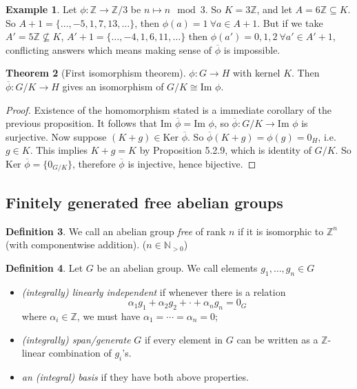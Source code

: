 \documentclass[a4paper]{article}
\newcommand{\Ker}{\text{Ker }}
\theoremstyle{definition}
\newtheorem{defn}{Definition}[subsection]
\newtheorem{thm}[defn]{Theorem}
\newtheorem{example}[defn]{Example}
\begin{document}
\begin{example}
Let $\phi: \mathbb Z \rightarrow \mathbb Z/3$ be $n\mapsto n\mod 3$. So $K=3\mathbb Z$, and let $A=6\mathbb Z \subseteq K.$ So $A+1=\{\ldots,-5,1,7,13,\ldots\}$, then $\phi(a) = 1 \ \forall a\in A+1.$ But if we take $A'=5\mathbb Z \not\subseteq K$, $A'+1=\{\ldots,-4,1,6,11,\ldots\}$ then $\phi(a')=0,1,2 \ \forall a'\in A'+1$, conflicting answers which means making sense of $\overline{\phi}$ is impossible.
\end{example}
\begin{thm}[First isomorphism theorem]
$\phi : G\rightarrow H$ with kernel $K.$ Then $\overline{\phi}: G/K \rightarrow H$ gives an isomorphism of $G/K \cong \text{Im }\phi.$
\end{thm}
\begin{proof}
Existence of the homomorphism stated is a immediate corollary of the previous proposition. It follows that $\text{Im }\overline{\phi}=\text{Im }\phi$, so $\overline{\phi}: G/K \rightarrow \text{Im }\phi$ is surjective. Now suppose $(K+g)\in \Ker \overline{\phi}$. So $\overline{\phi}(K+g)=\phi(g)=0_H$, i.e. $g\in K$. This implies $K+g=K$ by Proposition 5.2.9, which is identity of $G/K$. So $\Ker \overline{\phi}=\{0_{G/K}\}$, therefore $\overline{\phi}$ is injective, hence bijective.
\end{proof}

\subsection{Finitely generated free abelian groups}
\begin{defn}
We call an abelian group \textit{free} of rank $n$ if it is isomorphic to $\mathbb Z^n$ (with componentwise addition). ($n\in \mathbb N_{>0}$)
\end{defn}
\begin{defn}
Let $G$ be an abelian group. We call elements $g_1,\ldots,g_n \in G$
\begin{itemize}
\item \textit{(integrally) linearly independent} if whenever there is a relation
\[
\alpha_1 g_1 + \alpha_2 g_2 + \cdot + \alpha_n g_n = 0_G
\]
where $\alpha_i \in \mathbb Z$, we must have $\alpha_1=\cdots=\alpha_n=0$;
\item \textit{(integrally) span/generate} $G$ if every element in $G$ can be written as a $\mathbb Z$-linear combination of $g_i$'s.
\item \textit{an (integral) basis} if they have both above properties.
\end{itemize}
\end{defn}
\end{document}
